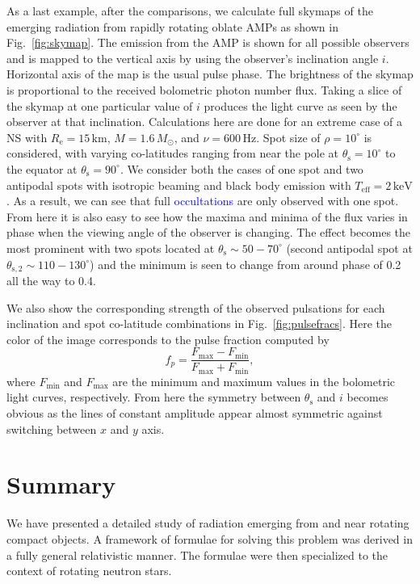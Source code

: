 \documentclass{aa}
\newcommand{\be}{\begin{equation}}
\newcommand{\ee}{\end{equation}}
\newcommand{\refe}[1]{\textcolor{blue}{{#1}}}
\newcommand{\Msun}{\ensuremath{M_{\odot}}}
\begin{document}
As a last example, after the comparisons, we calculate full skymaps of the emerging radiation from rapidly rotating oblate AMPs as shown in Fig.~\ref{fig:skymap}.
The emission from the AMP is shown for all possible observers and is mapped to the vertical axis by using the observer's inclination angle $i$.
Horizontal axis of the map is the usual pulse phase.
The brightness of the skymap is proportional to the received bolometric photon number flux.
Taking a slice of the skymap at one particular value of $i$ produces the light curve as seen by the observer at that inclination.
Calculations here are done for an extreme case of a NS with $R_{\mathrm{e}} = 15\,\mathrm{km}$, $M=1.6\,\Msun$, and $\nu = 600\,\mathrm{Hz}$.
Spot size of $\rho = 10^{\circ}$ is considered, with varying co-latitudes ranging from near the pole at $\theta_{\mathrm{s}} = 10^{\circ}$ to the equator at $\theta_{\mathrm{s}} = 90^{\circ}$.
We consider both the cases of one spot and two antipodal spots with isotropic beaming and black body emission with $T_{\mathrm{eff}} = 2\,\mathrm{keV}$.
As a result, we can see that full \refe{occultations} are only observed with one spot.
From here it is also easy to see how the maxima and minima of the flux varies in phase when the viewing angle of the observer is changing.
The effect becomes the most prominent with two spots located at $\theta_{\mathrm{s}} \sim 50-70^{\circ}$ (second antipodal spot at $\theta_{\mathrm{s,2}} \sim 110-130^{\circ}$) and the minimum is seen to change from around phase of 0.2 all the way to 0.4.

We also show the corresponding strength of the observed pulsations for each inclination and spot co-latitude combinations in Fig.~\ref{fig:pulsefracs}.
Here the color of the image corresponds to the pulse fraction computed by
\be
f_p = \frac{F_{\mathrm{max}} - F_{\mathrm{min}}}{F_{\mathrm{max}} + F_{\mathrm{min}}},
\ee
where $F_{\mathrm{min}}$ and $F_{\mathrm{max}}$ are the minimum and maximum values in the bolometric light curves, respectively.
From here the symmetry between $\theta_{\mathrm{s}}$ and $i$ becomes obvious as the lines of constant amplitude appear almost symmetric against switching between $x$ and $y$ axis.




\section{Summary}\label{sect:summary}
We have presented a detailed study of radiation emerging from and near rotating compact objects.
A framework of formulae for solving this problem was derived in a fully general relativistic manner. 
The formulae were then specialized to the context of rotating neutron stars.
\end{document}
